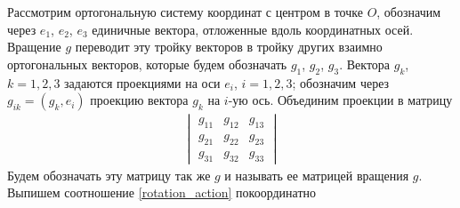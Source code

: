 \documentclass[14pt]{extarticle}
\begin{document}
Рассмотрим ортогональную систему координат с центром в точке $O$, обозначим через $e_1$, $e_2$, $e_3$ единичные вектора, отложенные вдоль координатных осей. Вращение $g$ переводит эту тройку векторов в тройку других взаимно ортогональных векторов, которые будем обозначать $g_1$, $g_2$, $g_3$. Вектора $g_k$, $k =1, 2, 3$ задаются проекциями на оси $e_i$, $i = 1,2,3$; обозначим через $g_{ik} = ( g_k, e_i )$ проекцию вектора $g_k$ на $i$-ую ось. Объединим проекции в матрицу
\begin{gather}
	\begin{vmatrix}
		g_{11} & g_{12} & g_{13} \\
		g_{21} & g_{22} & g_{23} \\
		g_{31} & g_{32} & g_{33}
	\end{vmatrix}
	\label{rotation_matrix}
\end{gather}
Будем обозначать эту матрицу так же $g$ и называть ее матрицей вращения $g$. Выпишем соотношение \eqref{rotation_action} покоординатно
\end{document}

